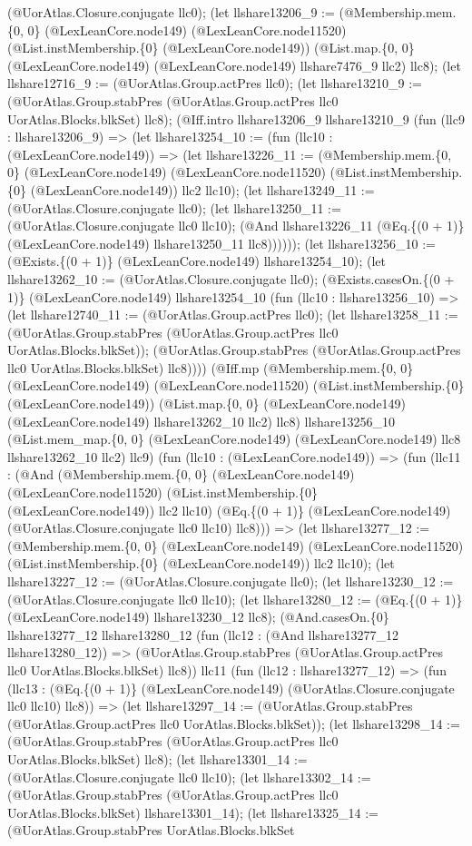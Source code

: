 \documentclass[11pt]{article}
\begin{document}
(@UorAtlas.Closure.conjugate llc0); (let llshare13206\_9 := (@Membership.mem.\{0, 0\} (@LexLeanCore.node149) (@LexLeanCore.node11520) (@List.instMembership.\{0\} (@LexLeanCore.node149)) (@List.map.\{0, 0\} (@LexLeanCore.node149) (@LexLeanCore.node149) llshare7476\_9 llc2) llc8); (let llshare12716\_9 := (@UorAtlas.Group.actPres llc0); (let llshare13210\_9 := (@UorAtlas.Group.stabPres (@UorAtlas.Group.actPres llc0 UorAtlas.Blocks.blkSet) llc8); (@Iff.intro llshare13206\_9 llshare13210\_9 (fun (llc9 : llshare13206\_9) => (let llshare13254\_10 := (fun (llc10 : (@LexLeanCore.node149)) => (let llshare13226\_11 := (@Membership.mem.\{0, 0\} (@LexLeanCore.node149) (@LexLeanCore.node11520) (@List.instMembership.\{0\} (@LexLeanCore.node149)) llc2 llc10); (let llshare13249\_11 := (@UorAtlas.Closure.conjugate llc0); (let llshare13250\_11 := (@UorAtlas.Closure.conjugate llc0 llc10); (@And llshare13226\_11 (@Eq.\{(0 + 1)\} (@LexLeanCore.node149) llshare13250\_11 llc8)))))); (let llshare13256\_10 := (@Exists.\{(0 + 1)\} (@LexLeanCore.node149) llshare13254\_10); (let llshare13262\_10 := (@UorAtlas.Closure.conjugate llc0); (@Exists.casesOn.\{(0 + 1)\} (@LexLeanCore.node149) llshare13254\_10 (fun (llc10 : llshare13256\_10) => (let llshare12740\_11 := (@UorAtlas.Group.actPres llc0); (let llshare13258\_11 := (@UorAtlas.Group.stabPres (@UorAtlas.Group.actPres llc0 UorAtlas.Blocks.blkSet)); (@UorAtlas.Group.stabPres (@UorAtlas.Group.actPres llc0 UorAtlas.Blocks.blkSet) llc8)))) (@Iff.mp (@Membership.mem.\{0, 0\} (@LexLeanCore.node149) (@LexLeanCore.node11520) (@List.instMembership.\{0\} (@LexLeanCore.node149)) (@List.map.\{0, 0\} (@LexLeanCore.node149) (@LexLeanCore.node149) llshare13262\_10 llc2) llc8) llshare13256\_10 (@List.mem\_map.\{0, 0\} (@LexLeanCore.node149) (@LexLeanCore.node149) llc8 llshare13262\_10 llc2) llc9) (fun (llc10 : (@LexLeanCore.node149)) => (fun (llc11 : (@And (@Membership.mem.\{0, 0\} (@LexLeanCore.node149) (@LexLeanCore.node11520) (@List.instMembership.\{0\} (@LexLeanCore.node149)) llc2 llc10) (@Eq.\{(0 + 1)\} (@LexLeanCore.node149) (@UorAtlas.Closure.conjugate llc0 llc10) llc8))) => (let llshare13277\_12 := (@Membership.mem.\{0, 0\} (@LexLeanCore.node149) (@LexLeanCore.node11520) (@List.instMembership.\{0\} (@LexLeanCore.node149)) llc2 llc10); (let llshare13227\_12 := (@UorAtlas.Closure.conjugate llc0); (let llshare13230\_12 := (@UorAtlas.Closure.conjugate llc0 llc10); (let llshare13280\_12 := (@Eq.\{(0 + 1)\} (@LexLeanCore.node149) llshare13230\_12 llc8); (@And.casesOn.\{0\} llshare13277\_12 llshare13280\_12 (fun (llc12 : (@And llshare13277\_12 llshare13280\_12)) => (@UorAtlas.Group.stabPres (@UorAtlas.Group.actPres llc0 UorAtlas.Blocks.blkSet) llc8)) llc11 (fun (llc12 : llshare13277\_12) => (fun (llc13 : (@Eq.\{(0 + 1)\} (@LexLeanCore.node149) (@UorAtlas.Closure.conjugate llc0 llc10) llc8)) => (let llshare13297\_14 := (@UorAtlas.Group.stabPres (@UorAtlas.Group.actPres llc0 UorAtlas.Blocks.blkSet)); (let llshare13298\_14 := (@UorAtlas.Group.stabPres (@UorAtlas.Group.actPres llc0 UorAtlas.Blocks.blkSet) llc8); (let llshare13301\_14 := (@UorAtlas.Closure.conjugate llc0 llc10); (let llshare13302\_14 := (@UorAtlas.Group.stabPres (@UorAtlas.Group.actPres llc0 UorAtlas.Blocks.blkSet) llshare13301\_14); (let llshare13325\_14 := (@UorAtlas.Group.stabPres UorAtlas.Blocks.blkSet 
\end{document}
